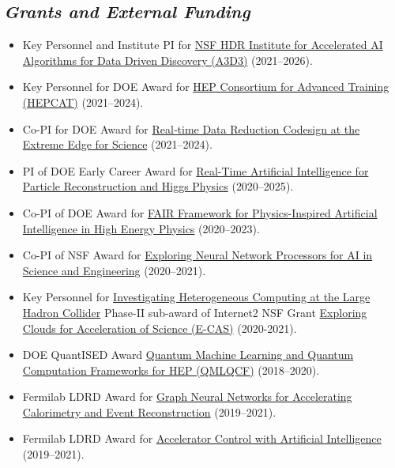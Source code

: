 \documentclass[11pt]{res}
\newcommand{\MarginText}[1]{\section{\textit{#1}}}
\begin{document}
\begin{resume}
  \MarginText{Grants and External Funding}
  \begin{itemize}
    \itemsep-0.3em
    \item Key Personnel and Institute PI for \href{https://www.nsf.gov/awardsearch/showAward?AWD_ID=2117997&HistoricalAwards=false}{NSF HDR Institute for Accelerated AI Algorithms for Data Driven Discovery (A3D3)} ({2021--2026}).
    \item Key Personnel for DOE Award for \href{https://science.osti.gov/-/media/hep/pdf/Awards/HEP_instrumentation_awards_list.pdf}{HEP Consortium for Advanced Training (HEPCAT)} ({2021--2024}).
    \item Co-PI for DOE Award for \href{https://science.osti.gov/-/media/ascr/pdf/funding/2021/Data_Reduction_Awards.pdf}{Real‐time Data Reduction Codesign at the Extreme Edge for Science} ({2021--2024}).
    \item PI of DOE Early Career Award for \href{https://science.osti.gov/-/media/early-career/pdf/FY20_DOE_SC_Early_Career_Research_Program_Abstracts.pdf}{Real-Time Artificial Intelligence for Particle Reconstruction and Higgs Physics} ({2020--2025}).
    \item Co-PI of DOE Award for \href{https://science.osti.gov/-/media/ascr/pdf/programdocuments/docs/2020/List_of_Awards_FAIR_Data.pdf}{FAIR Framework for Physics-Inspired Artificial Intelligence in High Energy Physics} ({2020--2023}).
    \item Co-PI of NSF Award for \href{https://nsf.gov/awardsearch/showAward?AWD_ID=2005369}{Exploring Neural Network Processors for AI in Science and Engineering} ({2020--2021}).
    \item Key Personnel for \href{https://www.internet2.edu/news/detail/17957/}{Investigating Heterogeneous Computing at the Large Hadron Collider} Phase-II sub-award of Internet2 NSF Grant \href{https://www.nsf.gov/awardsearch/showAward?AWD_ID=1904444}{Exploring Clouds for Acceleration of Science (E-CAS)} ({2020-2021}).
    \item DOE QuantISED Award \href{https://pamspublic.science.energy.gov/WebPAMSExternal/Interface/Common/ViewPublicAbstract.aspx?rv=1f7d4729-6f93-40bd-a55f-c108545b1ea9&rtc=24&PRoleId=10}{Quantum Machine Learning and Quantum Computation Frameworks for HEP (QMLQCF)} ({2018--2020}).
    \item Fermilab LDRD Award for \href{https://ldrd.fnal.gov/subdir/FNAL-LDRD-2019-017-D1.pdf}{Graph Neural Networks for Accelerating Calorimetry and Event Reconstruction} ({2019--2021}).
    \item Fermilab LDRD Award for \href{https://ldrd.fnal.gov/subdir/FNAL-LDRD-2019-027-D1.pdf}{Accelerator Control with Artificial Intelligence} ({2019--2021}).
  \end{itemize}


\end{resume}
\end{document}
